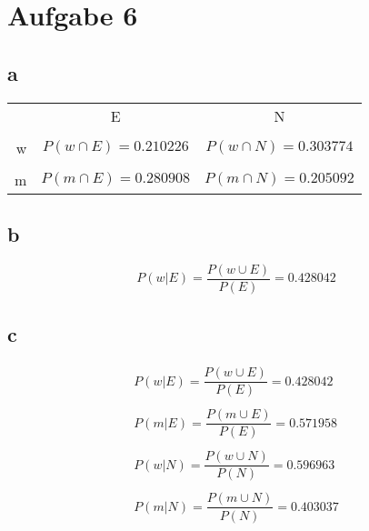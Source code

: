 
\section{Aufgabe 6}
\subsection{a}
\begin{tabular}{rcc}
    &E                          &N                          \\\\
w   &$P(w \cap E) = 0.210226$   &$P(w \cap N) = 0.303774$   \\\\
m   &$P(m \cap E) = 0.280908$   &$P(m \cap N) = 0.205092$   
\end{tabular}

\subsection{b}
\[ P(w|E) = \frac{P(w \cup E)}{P(E)} = 0.428042 \]

\subsection{c}
\[ \begin{array}{l}
P(w|E) = \dfrac{P(w \cup E)}{P(E)} = 0.428042 \\\\
P(m|E) = \dfrac{P(m \cup E)}{P(E)} = 0.571958 \\\\
P(w|N) = \dfrac{P(w \cup N)}{P(N)} = 0.596963 \\\\
P(m|N) = \dfrac{P(m \cup N)}{P(N)} = 0.403037
\end{array}\]
